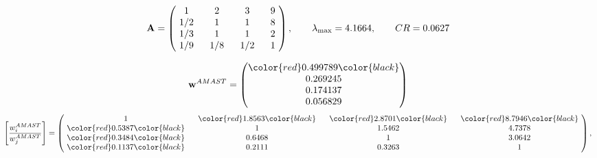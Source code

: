 \begin{example}
\begin{equation*}
\mathbf{A} =
\begin{pmatrix}
$\,\,$ 1 $\,\,$ & $\,\,$2$\,\,$ & $\,\,$3$\,\,$ & $\,\,$9 $\,\,$ \\
$\,\,$ 1/2$\,\,$ & $\,\,$ 1 $\,\,$ & $\,\,$1$\,\,$ & $\,\,$8 $\,\,$ \\
$\,\,$ 1/3$\,\,$ & $\,\,$ 1 $\,\,$ & $\,\,$ 1 $\,\,$ & $\,\,$2 $\,\,$ \\
$\,\,$ 1/9$\,\,$ & $\,\,$ 1/8$\,\,$ & $\,\,$ 1/2$\,\,$ & $\,\,$ 1  $\,\,$ \\
\end{pmatrix},
\qquad
\lambda_{\max} =
4.1664,
\qquad
CR = 0.0627
\end{equation*}

\begin{equation*}
\mathbf{w}^{AMAST} =
\begin{pmatrix}
\color{red} 0.499789\color{black} \\
0.269245\\
0.174137\\
0.056829
\end{pmatrix}\end{equation*}
\begin{equation*}
\left[ \frac{{w}^{AMAST}_i}{{w}^{AMAST}_j} \right] =
\begin{pmatrix}
$\,\,$ 1 $\,\,$ & $\,\,$\color{red} 1.8563\color{black} $\,\,$ & $\,\,$\color{red} 2.8701\color{black} $\,\,$ & $\,\,$\color{red} 8.7946\color{black} $\,\,$ \\
$\,\,$\color{red} 0.5387\color{black} $\,\,$ & $\,\,$ 1 $\,\,$ & $\,\,$1.5462$\,\,$ & $\,\,$4.7378  $\,\,$ \\
$\,\,$\color{red} 0.3484\color{black} $\,\,$ & $\,\,$0.6468$\,\,$ & $\,\,$ 1 $\,\,$ & $\,\,$3.0642 $\,\,$ \\
$\,\,$\color{red} 0.1137\color{black} $\,\,$ & $\,\,$0.2111$\,\,$ & $\,\,$0.3263$\,\,$ & $\,\,$ 1  $\,\,$ \\
\end{pmatrix},
\end{equation*}


\end{example}
